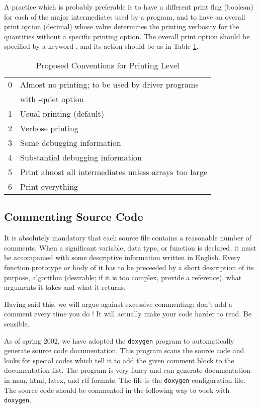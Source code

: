 A practice which is probably preferable is to have a different print
flag (boolean) for each of the major intermediates used by a program,
and to have an overall print option (decimal) whose value determines
the printing verbosity for the quantities without a specific printing
option.  The overall print option should be specified by a keyword
, and its action should be as in Table
\ref{tbl:iprint}.

\begin{table}
\caption{Proposed Conventions for Printing Level}
\label{tbl:iprint}
\begin{center}
\begin{tabular}{ll}
\hline \hline
0 & Almost no printing; to be used by driver programs \\
  & with -quiet option \\
1 & Usual printing (default) \\
2 & Verbose printing \\
3 & Some debugging information \\
4 & Substantial debugging information \\
5 & Print almost all intermediates unless arrays too large \\
6 & Print everything \\
\hline \hline
\end{tabular}
\end{center}
\end{table}

\subsection{Commenting Source Code}
\label{code-commenting}
It is absolutely mandatory that each source file contains a reasonable
number of comments. When a significant variable, data type, or
function is declared, it must be accompanied with some descriptive
information written in English.  Every function prototype or body of
it has to be preceeded by a short description of its purpose,
algorithm (desirable; if it is too complex, provide a reference), what
arguments it takes and what it returns.

Having said this, we will argue against excessive commenting: don't
add a comment every time you do !  It will actually make
your code harder to read.  Be sensible.

As of spring 2002, we have adopted the {\tt doxygen} program to
automatically generate source code documentation.  This program scans
the source code and looks for special codes which tell it to add the
given comment block to the documentation list.  The program is very
fancy and can generate documentation in man, html, latex, and rtf
formats.  The file  is the {\tt doxygen} configuration
file.  The source code should be commented in the following way to
work with {\tt doxygen}.

